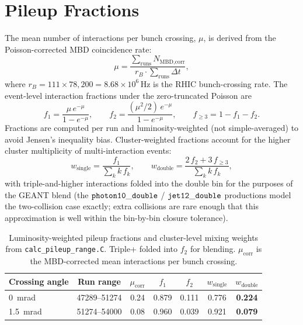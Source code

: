 \documentclass[11pt,a4paper]{article}
\begin{document}
\section{Pileup Fractions}
\label{sec:fractions}

The mean number of interactions per bunch crossing, $\mu$, is derived
from the Poisson-corrected MBD coincidence rate:
\begin{equation}
    \mu = \frac{\sum_{\text{runs}} N_{\text{MBD,corr}}}{r_B \cdot \sum_{\text{runs}} \Delta t},
\end{equation}
where $r_B = 111 \times 78{,}200 = 8.68 \times 10^{6}$\,Hz is the RHIC
bunch-crossing rate. The event-level interaction fractions under the
zero-truncated Poisson are
\begin{equation}
    f_1 = \frac{\mu\, e^{-\mu}}{1 - e^{-\mu}},\qquad
    f_2 = \frac{(\mu^2/2)\, e^{-\mu}}{1 - e^{-\mu}},\qquad
    f_{\geq 3} = 1 - f_1 - f_2.
\end{equation}
Fractions are computed per run and {luminosity}-weighted (not
simple-averaged) to avoid Jensen's inequality bias. Cluster-weighted
fractions account for the higher cluster multiplicity of
multi-interaction events:
\begin{equation}
    w_{\text{single}} = \frac{f_1}{\sum_k k\, f_k},\qquad
    w_{\text{double}} = \frac{2\, f_2 + 3\, f_{\geq 3}}{\sum_k k\, f_k},
\end{equation}
with triple-and-higher interactions folded into the double bin for the
purposes of the GEANT blend (the $\tt photon10\_double$ /
$\tt jet12\_double$ productions model the two-collision case exactly;
extra collisions are rare enough that this approximation is well within
the bin-by-bin closure tolerance).

\begin{table}[H]
    \centering
    \caption{Luminosity-weighted pileup fractions and cluster-level
      mixing weights from \texttt{calc\_pileup\_range.C}. Triple+ folded
      into $f_2$ for blending. $\mu_{\text{corr}}$ is the MBD-corrected
      mean interactions per bunch crossing.}
    \label{tab:pileup_fractions}
    \begin{tabular}{lcccccc}
        \toprule
        Crossing angle & Run range & $\mu_{\text{corr}}$ & $f_1$ & $f_2$ & $w_{\text{single}}$ & $w_{\text{double}}$ \\
        \midrule
        0~mrad   & 47289--51274 & 0.24 & 0.879 & 0.111 & 0.776 & \textbf{0.224} \\
        1.5~mrad & 51274--54000 & 0.08 & 0.960 & 0.039 & 0.921 & \textbf{0.079} \\
        \bottomrule
    \end{tabular}
\end{table}
\end{document}
